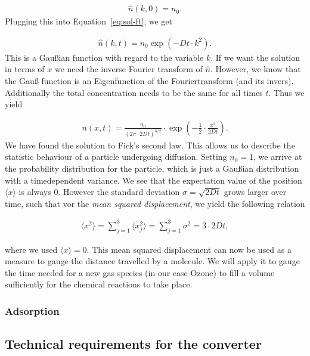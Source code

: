 \begin{align*}
  \hat n(k,0) = n_0.
\end{align*}
Plugging this into Equation~\eqref{eq:sol-ft}, we get

\begin{align*}
  \hat n(k,t) = n_0 \exp(-Dt \cdot k^2).
\end{align*}
This is a Gaußian function with regard to the variable $k$. If we want
the solution in terms of $x$ we need the inverse Fourier transform of
$\hat n$. However, we know that the Gauß function is an Eigenfunction
of the Fouriertransform (and its invers). Additionally the total
concentration needs to be the same for all times $t$. Thus we yield

\begin{align*}
  n(x,t) = \frac{n_0}{(2\pi \cdot 2Dt)^{3/2}} \cdot \exp \left(
  -\frac{1}{2} \cdot \frac{x^2}{2Dt} \right).
\end{align*}
We have found the solution to Fick's second law. This allows us to
describe the statistic behaviour of a particle undergoing
diffusion. Setting $n_0 = 1$, we arrive at the probability
distribution for the particle, which is just a Gaußian distribution
with a timedependent variance. We see that the expectation value of
the position $\langle x \rangle$ is always 0. However the standard
deviation $\sigma = \sqrt{2Dt}$
grows larger over time, such that vor the \emph{mean squared
  displacement}, we yield the following relation

\begin{align}
  \langle x^2 \rangle = \sum_{j=1}^3 \langle
  x_j^2 \rangle = \sum_{j=1}^3 \sigma^2 = 3 \cdot 2Dt, \label{eq:mqd}
\end{align}

where we used $\langle x \rangle = 0$. This mean squared displacement
can now be used as a measure to gauge the distance travelled by a
molecule. We will apply it to gauge the time needed for a new gas
species (in our case Ozone) to fill a volume sufficiently for the
chemical reactions to take place.

\subsubsection{Adsorption}
\label{sec:adsorption}

\subsection{Technical requirements for the converter}
\label{sec:requirements}

